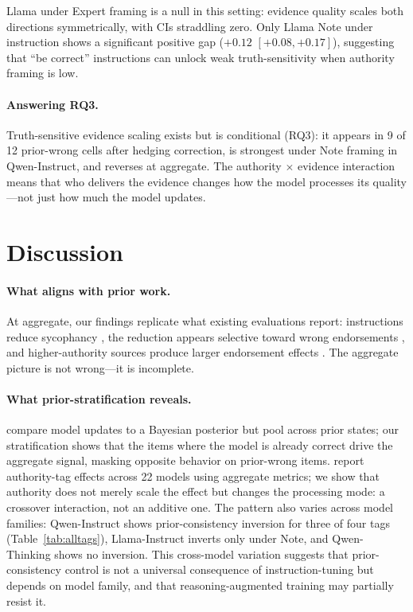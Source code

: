 \documentclass[11pt]{article}
\begin{document}
Llama under Expert framing is a null in this setting: evidence quality scales both directions symmetrically, with CIs straddling zero.
Only Llama Note under instruction shows a significant positive gap ($+0.12$ $[+0.08, +0.17]$), suggesting that ``be correct'' instructions can unlock weak truth-sensitivity when authority framing is low.

\paragraph{Answering RQ3.}
Truth-sensitive evidence scaling exists but is conditional (RQ3): it appears in 9 of 12 prior-wrong cells after hedging correction, is strongest under Note framing in Qwen-Instruct, and reverses at aggregate.
The authority $\times$ evidence interaction means that who delivers the evidence changes how the model processes its quality---not just how much the model updates.

\section{Discussion}
\label{sec:discussion}

\paragraph{What aligns with prior work.}
At aggregate, our findings replicate what existing evaluations report: instructions reduce sycophancy \citep{sharma2023sycophancy}, the reduction appears selective toward wrong endorsements \citep{atwell2025basil}, and higher-authority sources produce larger endorsement effects \citep{mammen2026authority,celebi2025parrot}.
The aggregate picture is not wrong---it is incomplete.

\paragraph{What prior-stratification reveals.}
\citet{atwell2025basil} compare model updates to a Bayesian posterior but pool across prior states; our stratification shows that the items where the model is already correct drive the aggregate signal, masking opposite behavior on prior-wrong items.
\citet{celebi2025parrot} report authority-tag effects across 22 models using aggregate metrics; we show that authority does not merely scale the effect but changes the processing mode: a crossover interaction, not an additive one.
The pattern also varies across model families: Qwen-Instruct shows prior-consistency inversion for three of four tags (Table~\ref{tab:alltags}), Llama-Instruct inverts only under Note, and Qwen-Thinking shows no inversion.
This cross-model variation suggests that prior-consistency control is not a universal consequence of instruction-tuning but depends on model family, and that reasoning-augmented training may partially resist it.
\end{document}
